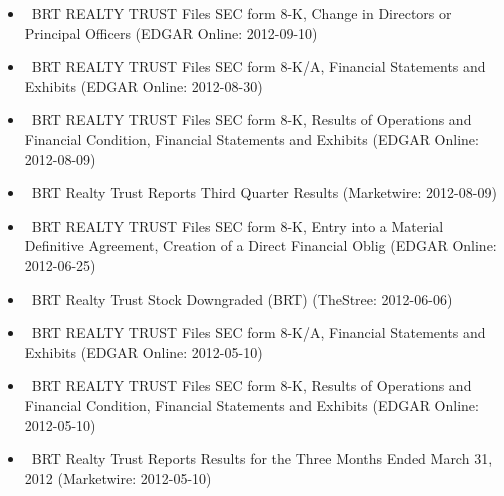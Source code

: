 \documentclass[11pt,asymmetric]{article}
\begin{document}
\begin{itemize}
\item\ BRT REALTY TRUST Files SEC form 8-K, Change in Directors or Principal Officers (EDGAR Online: 2012-09-10)
\item\ BRT REALTY TRUST Files SEC form 8-K/A, Financial Statements and Exhibits (EDGAR Online: 2012-08-30)
\item\ BRT REALTY TRUST Files SEC form 8-K, Results of Operations and Financial Condition, Financial Statements and Exhibits (EDGAR Online: 2012-08-09)
\item\ BRT Realty Trust Reports Third Quarter Results (Marketwire: 2012-08-09)
\item\ BRT REALTY TRUST Files SEC form 8-K, Entry into a Material Definitive Agreement, Creation of a Direct Financial Oblig (EDGAR Online: 2012-06-25)
\item\ BRT Realty Trust Stock Downgraded (BRT) (TheStree: 2012-06-06)
\item\ BRT REALTY TRUST Files SEC form 8-K/A, Financial Statements and Exhibits (EDGAR Online: 2012-05-10)
\item\ BRT REALTY TRUST Files SEC form 8-K, Results of Operations and Financial Condition, Financial Statements and Exhibits (EDGAR Online: 2012-05-10)
\item\ BRT Realty Trust Reports Results for the Three Months Ended March 31, 2012 (Marketwire: 2012-05-10)
\end{itemize}
\end{document}
